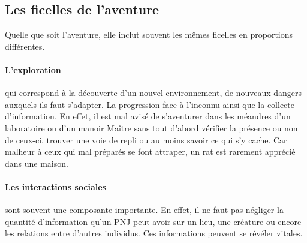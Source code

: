 \subsection{Les ficelles de l'aventure}

Quelle que soit l'aventure, elle inclut souvent les mêmes ficelles en proportions différentes.

\paragraph{L'exploration} qui correspond à la découverte d'un nouvel environnement, de nouveaux dangers auxquels ils faut s'adapter. La progression face à l'inconnu ainsi que la collecte d'information. En effet, il est mal avisé de s'aventurer dans les méandres d'un laboratoire ou d'un manoir Maître sans tout d'abord vérifier la présence ou non de ceux-ci, trouver une voie de repli ou au moins savoir ce qui s'y cache. Car malheur à ceux qui mal préparés se font attraper, un rat est rarement apprécié dans une maison.

\paragraph{Les interactions sociales} sont souvent une composante importante. En effet, il ne faut pas négliger la quantité d'information qu'un PNJ peut avoir sur un lieu, une créature ou encore les relations entre d'autres individus. Ces informations peuvent se révéler vitales.